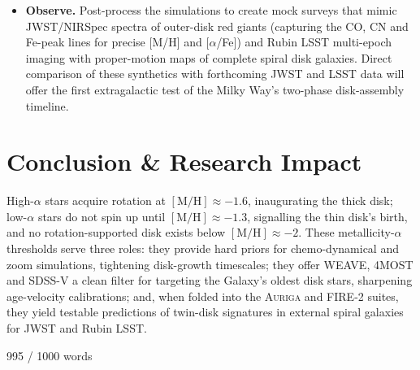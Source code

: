 \documentclass[a4paper,10pt]{article}
\begin{document}
\begin{multicols}{2}
\begin{itemize}
  \item \textbf{Observe.}  
        Post-process the simulations to create mock surveys that mimic JWST/NIRSpec spectra of outer-disk red giants
        (capturing the CO, CN and Fe-peak lines for precise [M/H] and [$\alpha$/Fe]) and Rubin LSST multi-epoch imaging with proper-motion maps of
        complete spiral disk galaxies.  Direct comparison of these synthetics with forthcoming JWST and LSST data will offer the
        first extragalactic test of the Milky Way's two-phase disk-assembly timeline.

\end{itemize}

\section*{Conclusion \& Research Impact}

High-$\alpha$ stars acquire rotation at $\mathrm{[M/H]}\approx-1.6$, inaugurating the thick disk; 
low-$\alpha$ stars do not spin up until $\mathrm{[M/H]}\approx-1.3$, signalling the thin disk's 
birth, and no rotation-supported disk exists below $\mathrm{[M/H]}\approx-2$.  These 
metallicity-$\alpha$ thresholds serve three roles: they provide hard priors for chemo-dynamical 
and zoom simulations, tightening disk-growth timescales; they offer WEAVE, 4MOST and SDSS-V a 
clean filter for targeting the Galaxy's oldest disk stars, sharpening age-velocity calibrations; 
and, when folded into the \textsc{Auriga} and \textsc{FIRE-2} suites, they yield testable predictions 
of twin-disk signatures in external spiral galaxies for JWST and Rubin LSST.



\newpage{}

995 / 1000 words








  


\end{multicols}
\end{document}
